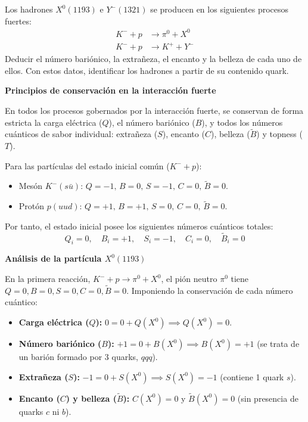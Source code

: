 \begin{problema}
\end{problema}

\newpage
\begin{problema}
Los hadrones $X^0(1193)$ e $Y^-(1321)$ se producen en los siguientes procesos fuertes:
\begin{align*}
    K^- + p &\longrightarrow \pi^0 + X^0 \\
    K^- + p &\longrightarrow K^+ + Y^-
\end{align*}
Deducir el número bariónico, la extrañeza, el encanto y la belleza de cada uno de ellos. Con estos datos, identificar los hadrones a partir de su contenido quark.

\tcblower
\textbf{Principios de conservación en la interacción fuerte}

En todos los procesos gobernados por la interacción fuerte, se conservan de forma estricta la carga eléctrica ($Q$), el número bariónico ($B$), y todos los números cuánticos de sabor individual: extrañeza ($S$), encanto ($C$), belleza ($\tilde{B}$) y topness ($T$).

Para las partículas del estado inicial común ($K^- + p$):
\begin{itemize}
    \item Mesón $K^- (s\bar{u})$: $Q = -1, \, B = 0, \, S = -1, \, C = 0, \, \tilde{B} = 0$.
    \item Protón $p (uud)$: $Q = +1, \, B = +1, \, S = 0, \, C = 0, \, \tilde{B} = 0$.
\end{itemize}
Por tanto, el estado inicial posee los siguientes números cuánticos totales:
\begin{equation*}
    Q_i = 0, \quad B_i = +1, \quad S_i = -1, \quad C_i = 0, \quad \tilde{B}_i = 0
\end{equation*}

\textbf{Análisis de la partícula $X^0(1193)$}

En la primera reacción, $K^- + p \longrightarrow \pi^0 + X^0$, el pión neutro $\pi^0$ tiene $Q = 0, B = 0, S = 0, C = 0, \tilde{B} = 0$. Imponiendo la conservación de cada número cuántico:
\begin{itemize}
    \item \textbf{Carga eléctrica ($Q$):} $0 = 0 + Q(X^0) \implies Q(X^0) = 0$.
    \item \textbf{Número bariónico ($B$):} $+1 = 0 + B(X^0) \implies B(X^0) = +1$ (se trata de un barión formado por 3 quarks, $qqq$).
    \item \textbf{Extrañeza ($S$):} $-1 = 0 + S(X^0) \implies S(X^0) = -1$ (contiene 1 quark $s$).
    \item \textbf{Encanto ($C$) y belleza ($\tilde{B}$):} $C(X^0) = 0$ y $\tilde{B}(X^0) = 0$ (sin presencia de quarks $c$ ni $b$).
\end{itemize}


\end{problema}
